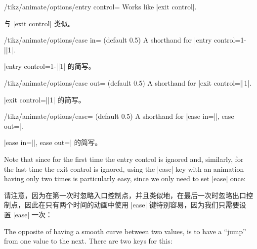 \begin{key}{/tikz/animate/options/entry control=}
    Works like |exit control|.

    与 |exit control| 类似。


\end{key}

\begin{key}{/tikz/animate/options/ease in= (default 0.5)}
    A shorthand for |entry control={1-||}{1}|.

    |entry control={1-||}{1}| 的简写。

\end{key}

\begin{key}{/tikz/animate/options/ease out= (default 0.5)}
    A shorthand for |exit control={||}{1}|.

    |exit control={||}{1}| 的简写。

\end{key}

\begin{key}{/tikz/animate/options/ease= (default 0.5)}
    A shorthand for |ease in=||, ease out=|.

    |ease in=||, ease out=| 的简写。


    Note that since for the first time the entry control is ignored and,
    similarly, for the last time the exit control is ignored, using the |ease|
    key with an animation having only two times is particularly easy, since we
    only need to set |ease| once:
    
    请注意，因为在第一次时忽略入口控制点，并且类似地，在最后一次时忽略出口控制点，因此在只有两个时间的动画中使用 |ease| 键特别容易，因为我们只需要设置 |ease| 一次：


\begin{codeexample}[
    preamble={\usetikzlibrary{animations}},
    animation list={0.333/\frac{1}{3},0.666/\frac{2}{3},1,1.333/1\frac{1}{3},1.666/1\frac{2}{3}},
]
\end{codeexample}
\end{key}

The opposite of having a smooth curve between two values, is to have a ``jump''
from one value to the next. There are two keys for this:


